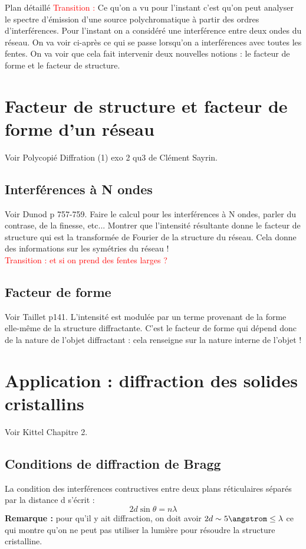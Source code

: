 \begin{reportBlock}{Plan détaillé}
  \textcolor{red}{Transition :} Ce qu'on a vu pour l'instant c'est qu'on peut analyser le spectre d'émission d'une source polychromatique à partir des ordres d'interférences. Pour l'instant on a considéré une interférence entre deux ondes du réseau. On va voir ci-après ce qui se passe lorsqu'on a interférences avec toutes les fentes. On va voir que cela fait intervenir deux nouvelles notions : le facteur de forme et le facteur de structure.

  \section{Facteur de structure et facteur de forme d'un réseau}
  Voir Polycopié Diffration (1) exo 2 qu3 de Clément Sayrin.
  \subsection{Interférences à N ondes}
  Voir Dunod p 757-759. Faire le calcul pour les interférences à N ondes, parler du contrase, de la finesse, etc... Montrer que l'intensité résultante donne le facteur de structure qui est la transformée de Fourier de la structure du réseau. Cela donne des informations sur les symétries du réseau !\\

  \textcolor{red}{Transition : et si on prend des fentes larges ?}

  \subsection{Facteur de forme}
  Voir Taillet p141. L'intensité est modulée par un terme provenant de la forme elle-même de la structure diffractante. C'est le facteur de forme qui dépend donc de la nature de l'objet diffractant : cela renseigne sur la nature interne de l'objet !

  \section{Application : diffraction des solides cristallins}
  Voir Kittel Chapitre 2.
  \subsection{Conditions de diffraction de Bragg}
  La condition des interférences contructives entre deux plans réticulaires séparés par la distance d s'écrit :
  \begin{equation}
      2d\sin{\theta} = n\lambda
  \end{equation}
  \textbf{Remarque :} pour qu'il y ait diffraction, on doit avoir $2d\sim 5\angstrom\leq\lambda$ ce qui montre qu'on ne peut pas utiliser la lumière pour résoudre la structure cristalline.\\


\end{reportBlock}
